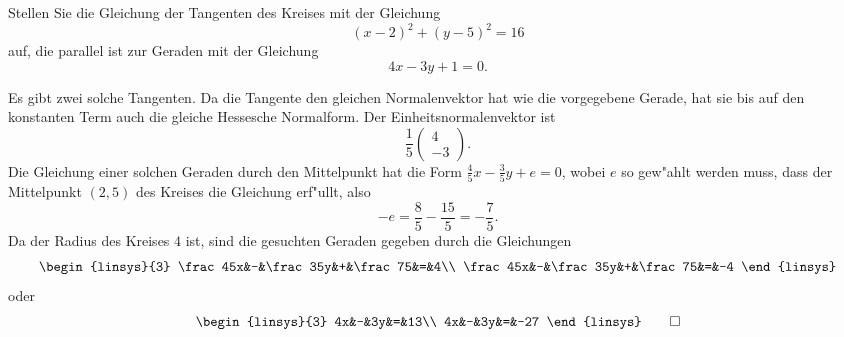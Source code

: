 Stellen Sie die Gleichung der Tangenten des Kreises mit der Gleichung
\[
(x-2)^2+(y-5)^2=16
\]
auf, die parallel ist zur Geraden mit der Gleichung
\[
4x-3y+1=0.
\]

\begin{loesung}
Es gibt zwei solche Tangenten. Da die Tangente den gleichen Normalenvektor
hat wie die vorgegebene Gerade, hat sie bis auf den konstanten Term
auch die gleiche Hessesche Normalform. Der Einheitsnormalenvektor
ist
\[
\frac15\begin{pmatrix}4\\-3\end{pmatrix}.
\]
Die Gleichung einer solchen Geraden durch den Mittelpunkt hat
die Form $\frac45x-\frac35y+e=0$, wobei $e$ so gew"ahlt werden
muss, dass der Mittelpunkt $(2,5)$ des Kreises die Gleichung
erf"ullt, also
\[
-e=\frac85-\frac{15}5=-\frac75.
\]
Da der Radius des Kreises $4$ ist, sind die gesuchten Geraden gegeben
durch die Gleichungen
\[
\begin{linsys}{3}
\frac45x&-&\frac35y&+&\frac75&=&4\\
\frac45x&-&\frac35y&+&\frac75&=&-4
\end{linsys}
\]
oder
\[
\begin{linsys}{3}
4x&-&3y&=&13\\
4x&-&3y&=&-27
\end{linsys}
\qedhere
\]
\end{loesung}
